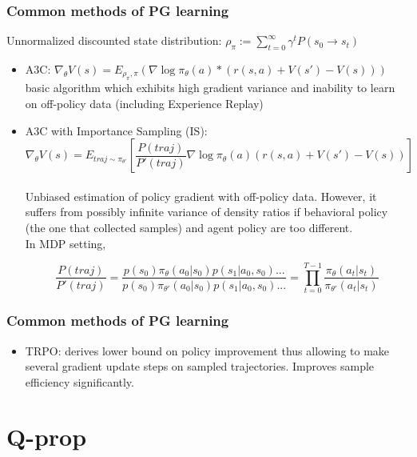 \documentclass{beamer}
\begin{document}
\begin{frame}[t]
\frametitle{Common methods of PG learning}

Unnormalized discounted state distribution: $\rho_\pi :=  \sum_{t=0}^\infty \gamma^t P(s_0 \rightarrow s_t)$ 

\begin{itemize}

\item A3C: $\nabla_\theta V(s) = E_{\rho_\pi, \pi}(\nabla \log \pi_\theta (a) * (r(s,a) + V(s') - V(s)))$ 
\\basic algorithm which exhibits high gradient variance and inability to learn on off-policy data (including Experience Replay)

\item A3C with Importance Sampling (IS): \[ \nabla_\theta V(s) = E_{traj \sim \pi_{\theta'}} \left[ \dfrac{P(traj)}{P'(traj)} \nabla \log \pi_\theta (a) (r(s,a) + V(s') - V(s)) \right] \]
\\Unbiased estimation of policy gradient with off-policy data. However, it suffers from possibly infinite variance of density ratios if behavioral policy (the one that collected samples) and agent policy are too different.
\\In MDP setting, 

\begin{equation}
\dfrac{P(traj)}{P'(traj)} = \dfrac{p(s_0) \pi_{\theta} (a_0 | s_0) p(s_1 | a_0, s_0)
...} {p(s_0) \pi_{\theta'} (a_0 | s_0) p(s_1 | a_0, s_0)
...} = \prod_{t=0}^{T-1} \dfrac{\pi_\theta (a_t | s_t)} {\pi_{\theta'} (a_t | s_t)}
\end{equation}

\end{itemize}
\end{frame}

\begin{frame}[t]
\frametitle{Common methods of PG learning}
\begin{itemize}

\item TRPO: derives lower bound on policy improvement thus allowing to make several gradient update steps on sampled trajectories. Improves sample efficiency significantly.

\end{itemize}
\end{frame}

\section{Q-prop}
\end{document}

